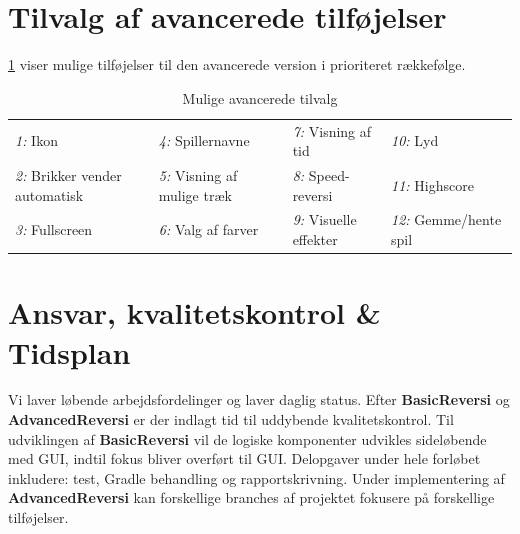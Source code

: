 \documentclass[a4paper, danish]{article}
\numberwithin{equation}{section}
\begin{document}
\section{Tilvalg af avancerede tilføjelser}
\cref{tbl:avanceret} viser mulige tilføjelser til den avancerede version i prioriteret rækkefølge.
\begin{table}[H]
    \centering
    \caption{Mulige avancerede tilvalg}\label{tbl:avanceret}
    \begin{tabular}{llll}
        \toprule
        \emph{1:} Ikon                      & \emph{4:} Spillernavne           & \emph{7:} Visning af tid    & \emph{10:} Lyd              \\
        \emph{2:} Brikker vender automatisk & \emph{5:} Visning af mulige træk & \emph{8:} Speed-reversi     & \emph{11:} Highscore       \\
        \emph{3:} Fullscreen                & \emph{6:} Valg af farver         & \emph{9:} Visuelle effekter & \emph{12:} Gemme/hente spil \\
        \bottomrule
    \end{tabular}
\end{table}
\section{Ansvar, kvalitetskontrol \& Tidsplan}
Vi laver løbende arbejdsfordelinger og laver daglig status. Efter \textbf{BasicReversi} og \textbf{AdvancedReversi} er der indlagt tid til uddybende kvalitetskontrol. Til udviklingen af \textbf{BasicReversi} vil de logiske komponenter udvikles sideløbende med GUI, indtil fokus bliver overført til GUI. Delopgaver under hele forløbet inkludere: test, Gradle behandling og rapportskrivning. Under implementering af \textbf{AdvancedReversi} kan forskellige branches af projektet fokusere på forskellige tilføjelser.
\end{document}
